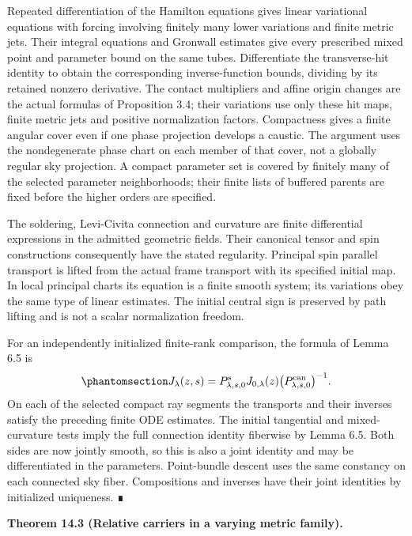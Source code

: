 \documentclass[
  english,
  11pt,
  reqno]{amsart}
\makeatletter
\newcommand{\pandocstatementheading}[1]{%
  \par\if@nobreak\else
    \addpenalty{\@beginparpenalty}%
    \addvspace{.5\baselineskip plus .2\baselineskip minus .2\baselineskip}%
  \fi
  {\normalfont\bfseries #1\par}%
  \nobreak\@afterindenttrue\@afterheading
}
\makeatother
\begin{document}
Repeated differentiation of the Hamilton equations gives linear
variational equations with forcing involving finitely many lower
variations and finite metric jets. Their integral equations and Gronwall
estimates give every prescribed mixed point and parameter bound on the
same tubes. Differentiate the transverse-hit identity to obtain the
corresponding inverse-function bounds, dividing by its retained nonzero
derivative. The contact multipliers and affine origin changes are the
actual formulas of Proposition 3.4; their variations use only these hit
maps, finite metric jets and positive normalization factors. Compactness
gives a finite angular cover even if one phase projection develops a
caustic. The argument uses the nondegenerate phase chart on each member
of that cover, not a globally regular sky projection. A compact
parameter set is covered by finitely many of the selected parameter
neighborhoods; their finite lists of buffered parents are fixed before
the higher orders are specified.

The soldering, Levi-Civita connection and curvature are finite
differential expressions in the admitted geometric fields. Their
canonical tensor and spin constructions consequently have the stated
regularity. Principal spin parallel transport is lifted from the actual
frame transport with its specified initial map. In local principal
charts its equation is a finite smooth system; its variations obey the
same type of linear estimates. The initial central sign is preserved by
path lifting and is not a scalar normalization freedom.

For an independently initialized finite-rank comparison, the formula of
Lemma 6.5 is
\begin{equation}\protect\phantomsection\label{eq:family-initialized-finite-rank-comparison}{
J_\lambda(z,s)
=P^{\mathrm s}_{\lambda,s,0}
 J_{0,\lambda}(z)
 \bigl(P^{\mathrm{can}}_{\lambda,s,0}\bigr)^{-1}.
}\end{equation} On each of the selected compact ray segments the
transports and their inverses satisfy the preceding finite ODE
estimates. The initial tangential and mixed-curvature tests imply the
full connection identity fiberwise by Lemma 6.5. Both sides are now
jointly smooth, so this is also a joint identity and may be
differentiated in the parameters. Point-bundle descent uses the same
constancy on each connected sky fiber. Compositions and inverses have
their joint identities by initialized uniqueness. ∎

\pandocstatementheading{\protect{}\label{thm:family-relative-carrier-comparison}Theorem 14.3 (Relative carriers in a varying metric family).}
\end{document}
